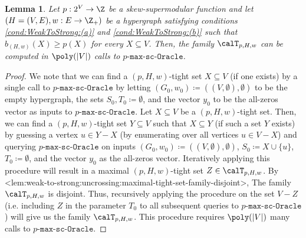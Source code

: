 \documentclass{article}
\def\Cref#1{<#1>}%
\newtheorem{lemma}{Lemma}[section]
\newcommand{\functionMaximizationOracleStrongCover}[1]{\ensuremath{{#1}\text{-}\mathtt{max}\text{-}\mathtt{sc}\text{-}\mathtt{Oracle}}\xspace}
\newcommand{\maximalTightSetFamily}[1]{\ensuremath{\calT_{#1}}\xspace}
\begin{document}
 \begin{lemma}\label{lem:WeakToStrong::maximal-tight-set-family-computed-in-strongly-polytime}
 Let $p:2^V\rightarrow\Z$ be a skew-supermodular function and let $\left(H = (V, E), w:E \rightarrow\Z_+\right)$ be a hypergraph satisfying conditions \ref{cond:WeakToStrong:(a)} and \ref{cond:WeakToStrong:(b)} such that $b_{(H,w)}(X) \geq p(X)$ for every $X \subseteq V$. Then, the family $\maximalTightSetFamily{p, H, w}$ can be computed in $\poly(|V|)$ calls to \functionMaximizationOracleStrongCover{p}.
\end{lemma}
\begin{proof}
    We note that we can find a $(p, H, w)$-tight set $X\subseteq V$ 
    (if one exists) by a single call to \functionMaximizationOracleStrongCover{p} by letting  $(G_0, w_0) \coloneqq  \left((V, \emptyset), \emptyset\right)$ to be the empty hypergraph, the sets $S_0, T_0 \coloneqq  \emptyset$, and the vector $y_0$ to be the all-zeros vector as inputs to $\functionMaximizationOracleStrongCover{{p}}$. 
    Let $X \subseteq V$ be a $(p, H, w)$-tight set. Then, we can find a $(p, H, w)$-tight set $Y \subseteq V$ such that $X \subseteq Y$ (if such a set $Y$ exists) by guessing a vertex $u \in Y - X$ (by enumerating over all vertices $u \in V - X$) and querying $\functionMaximizationOracleStrongCover{p}$ on inputs  $(G_0, w_0) \coloneqq  \left((V, \emptyset), \emptyset\right)$, $S_0 \coloneqq  X \cup \{u\}$, $T_0 \coloneqq  \emptyset$, and the vector $y_0$ as the all-zeros vector. Iteratively applying this procedure will result in a maximal $(p, H, w)$-tight set $Z \in \maximalTightSetFamily{p, H, w}$. By \Cref{lem:weak-to-strong:uncrossing:maximal-tight-set-family-disjoint}, The family $\maximalTightSetFamily{p, H, w}$ is disjoint. Thus, recursively applying the procedure on the set $V - Z$ (i.e. including $Z$ in the parameter $T_0$ to all subsequent queries to \functionMaximizationOracleStrongCover{p}) will give us the family $\maximalTightSetFamily{p, H, w}$. This procedure requires  $\poly(|V|)$ many calls to \functionMaximizationOracleStrongCover{p}.
    \end{proof}
\end{document}
